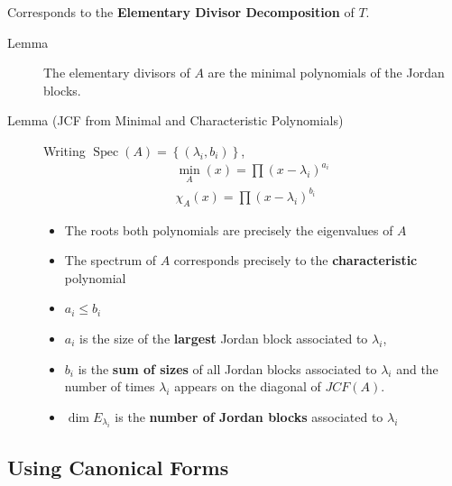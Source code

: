 Corresponds to the \textbf{Elementary Divisor Decomposition} of \(T\).

\begin{description}
\item[Lemma]
The elementary divisors of \(A\) are the minimal polynomials of the
Jordan blocks.
\item[Lemma (JCF from Minimal and Characteristic Polynomials)]
Writing \(\operatorname{Spec}(A) = \left\{{(\lambda_i, b_i)}\right\}\),
\begin{align*} \min_A(x) = \prod (x- \lambda_i)^{a_i} \\ \chi_A(x) = \prod (x- \lambda_i)^{b_i} \end{align*}

\begin{itemize}
\item
  The roots both polynomials are precisely the eigenvalues of \(A\)
\item
  The spectrum of \(A\) corresponds precisely to the
  \textbf{characteristic} polynomial
\item
  \(a_i \leq b_i\)
\item
  \(a_i\) is the size of the \textbf{largest} Jordan block associated to
  \(\lambda_i\),
\item
  \(b_i\) is the \textbf{sum of sizes} of all Jordan blocks associated
  to \(\lambda_i\) and the number of times \(\lambda_i\) appears on the
  diagonal of \(JCF(A)\).
\item
  \(\dim E_{\lambda_i}\) is the \textbf{number of Jordan blocks}
  associated to \(\lambda_i\)
\end{itemize}
\end{description}

\hypertarget{using-canonical-forms}{%
\subsection{Using Canonical Forms}\label{using-canonical-forms}}

